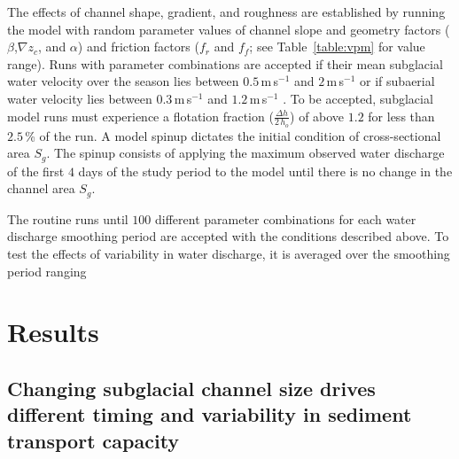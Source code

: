 \documentclass[tc, manuscript]{copernicus}
\begin{document}
The effects of channel shape, gradient, and roughness are established by running the model with random parameter values of channel slope and geometry factors ($\beta$,$\nabla z_c$, and $\alpha$) and friction factors ($f_r$ and $f_f$; see Table~\ref{table:vpm} for value range).
Runs with parameter combinations are accepted if their mean subglacial water velocity over the season lies between $0.5$\,\unit{m}\,\unit{s}$^{-1}$ and $2$\,\unit{m}\,\unit{s}$^{-1}$ or if subaerial water velocity lies between $0.3$\,\unit{m}\,\unit{s}$^{-1}$ and $1.2$\,\unit{m}\,\unit{s}$^{-1}$ \citep[e.g.][]{werder2010b,magnusson2012,chandler2013}.
To be accepted, subglacial model runs must experience a flotation fraction ($\frac{\Delta h}{2\,h_o}$) of above $1.2$ for less than $2.5$\,\% of the run.
A model spinup dictates the initial condition of cross-sectional area $S_g$.
The spinup consists of applying the maximum observed water discharge of the first $4$ days of the study period to the model until there is no change in the channel area $S_g$. 

The routine runs until $100$ different parameter combinations for each water discharge smoothing period are accepted with the conditions described above.
To test the effects of variability in water discharge, it is averaged over the smoothing period ranging 



\section{Results}

\FloatBarrier

\subsection{Changing subglacial channel size drives different timing and variability in sediment transport capacity}
\end{document}
